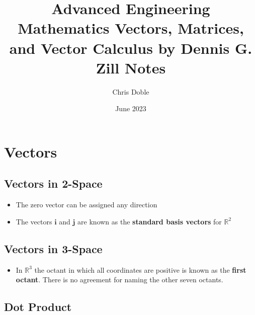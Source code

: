 \documentclass{article}
\title{Advanced Engineering Mathematics Vectors, Matrices, and Vector Calculus by Dennis G. Zill Notes}
\author{Chris Doble}
\date{June 2023}
\begin{document}
\maketitle

\tableofcontents

\section{Vectors}

\subsection{Vectors in 2-Space}

\begin{itemize}
  \item The zero vector can be assigned any direction

  \item The vectors $\textbf{i}$ and $\textbf{j}$ are known as the \textbf{standard basis vectors} for $\mathbb{R}^2$
\end{itemize}

\subsection{Vectors in 3-Space}

\begin{itemize}
  \item In $\mathbb{R}^3$ the octant in which all coordinates are positive is known as the \textbf{first octant}. There is no agreement for naming the other seven octants.
\end{itemize}

\subsection{Dot Product}
\end{document}
